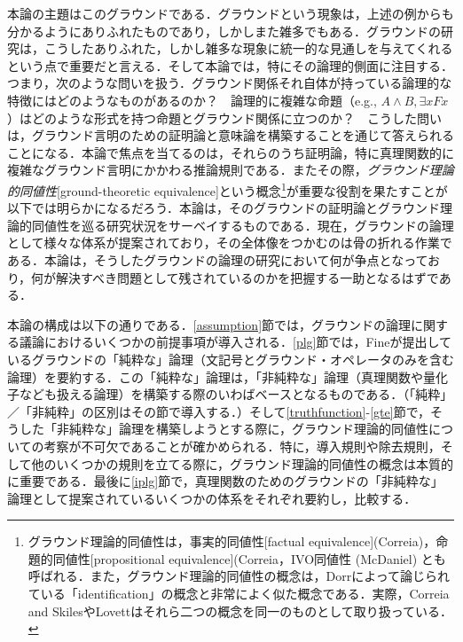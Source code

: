 \documentclass[twoside,14Q,uplatex,dvipdfmx]{jsarticle}
\theoremstyle{definition}
\begin{document}
本論の主題はこのグラウンドである．グラウンドという現象は，上述の例からも分かるようにありふれたものであり，しかしまた雑多でもある．グラウンドの研究は，こうしたありふれた，しかし雑多な現象に統一的な見通しを与えてくれるという点で重要だと言える．そして本論では，特にその論理的側面に注目する．つまり，次のような問いを扱う．グラウンド関係それ自体が持っている論理的な特徴にはどのようなものがあるのか？　論理的に複雑な命題（e.g., $A\land B, \exists xFx$）はどのような形式を持つ命題とグラウンド関係に立つのか？　こうした問いは，グラウンド言明のための証明論と意味論を構築することを通じて答えられることになる．本論で焦点を当てるのは，それらのうち証明論，特に真理関数的に複雑なグラウンド言明にかかわる推論規則である．またその際，\emph{グラウンド理論的同値性}[ground-theoretic equivalence]という概念\footnote{グラウンド理論的同値性は，事実的同値性[factual equivalence](Correia\cite{Correia2010})，命題的同値性[propositional equivalence](Correia\cite{Correia2017}，IVO同値性 (McDaniel\cite{McDaniel2015}) とも呼ばれる．また，グラウンド理論的同値性の概念は，Dorr\cite{Dorr2016}によって論じられている「identification」の概念と非常によく似た概念である．実際，Correia and Skiles\cite{CorreiaandSkiles2019}やLovett\cite{Lovett2020}はそれら二つの概念を同一のものとして取り扱っている．}が重要な役割を果たすことが以下では明らかになるだろう．本論は，そのグラウンドの証明論とグラウンド理論的同値性を巡る研究状況をサーベイするものである．現在，グラウンドの論理として様々な体系が提案されており，その全体像をつかむのは骨の折れる作業である．本論は，そうしたグラウンドの論理の研究において何が争点となっており，何が解決すべき問題として残されているのかを把握する一助となるはずである．

本論の構成は以下の通りである．\ref{assumption}節では，グラウンドの論理に関する議論におけるいくつかの前提事項が導入される．\ref{plg}節では，Fine\cite{Fine2012a,Fine2012b}が提出しているグラウンドの「純粋な」論理（文記号とグラウンド・オペレータのみを含む論理）を要約する．この「純粋な」論理は，「非純粋な」論理（真理関数や量化子なども扱える論理）を構築する際のいわばベースとなるものである．（「純粋」／「非純粋」の区別はその節で導入する．）そして\ref{truthfunction}-\ref{gte}節で，そうした「非純粋な」論理を構築しようとする際に，グラウンド理論的同値性についての考察が不可欠であることが確かめられる．特に，導入規則や除去規則，そして他のいくつかの規則を立てる際に，グラウンド理論的同値性の概念は本質的に重要である．最後に\ref{iplg}節で，真理関数のためのグラウンドの「非純粋な」論理として提案されているいくつかの体系をそれぞれ要約し，比較する．
%
%
%
\end{document}
